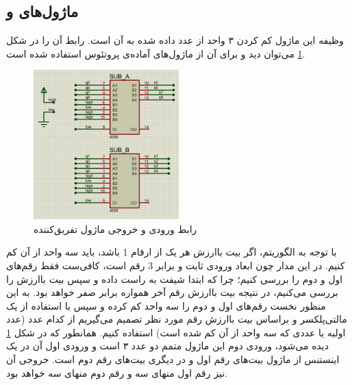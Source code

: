 \documentclass[12pt,onecolumn,a4paper,fleqn]{article}
\begin{document}
	\subsection{ماژول‌های  و }
	\label{subsec:subtractor}
	وظیفه این ماژول کم کردن ۳ واحد از عدد داده شده به آن است. رابط آن را در شکل \ref{fig:sub} می‌توان دید و برای آن از ماژول‌های آماده‌ی پروتئوس استفاده شده است.
	\begin{figure}[H]
		\centering
		\includegraphics[width=0.5\textwidth]{source/sub.png}
		\caption{رابط ورودی و خروجی ماژول تفریق‌کننده}
		\label{fig:sub}
	\end{figure}
	با توجه به الگوریتم، اگر بیت باارزش هر یک از ارقام 1 باشد، باید سه واحد از آن کم کنیم. در این مدار چون ابعاد ورودی ثابت و برابر 3 رقم است، کافی‌ست فقط رقم‌های اول و دوم را بررسی کنیم؛ چرا که ابتدا شیفت به راست داده و سپس بیت باارزش را بررسی می‌کنیم، در نتیجه بیت باارزش رقم آخر همواره برابر صفر خواهد بود. به این منظور نخست رقم‌های اول و دوم را سه واحد کم کرده و سپس با استفاده از یک مالتی‌پلکسر و براساس بیت باارزش رقم مورد نظر تصمیم می‌گیریم از کدام عدد (عدد اولیه یا عددی که سه واحد از آن کم شده است) استفاده کنیم. همانطور که در شکل \ref{fig:sub} دیده می‌شود، ورودی دوم این ماژول متمم دو عدد ۳ است و ورودی اول آن در یک اینستنس از ماژول بیت‌های رقم اول و در دیگری بیت‌های رقم دوم است. خروجی آن نیز رقم اول منهای سه و رقم دوم منهای سه خواهد بود.
\end{document}
